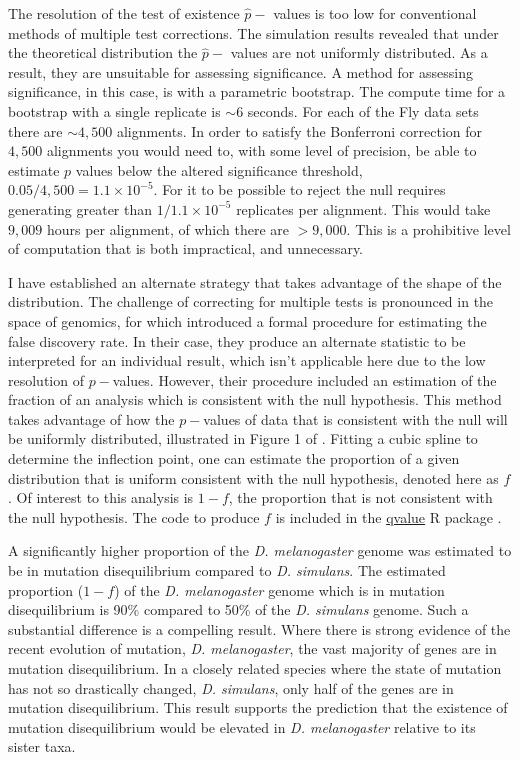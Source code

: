 The resolution of the test of existence $\hat p-$ values is too low for conventional methods of multiple test corrections. The simulation results revealed that under the theoretical distribution the $\hat p-$ values are not uniformly distributed. As a result, they are unsuitable for assessing significance. A method for assessing significance, in this case, is with a parametric bootstrap. The compute time for a bootstrap with a single replicate is ${\sim} 6$ seconds. For each of the Fly data sets there are ${\sim} 4,500$ alignments. In order to satisfy the Bonferroni correction for $4,500$ alignments you would need to, with some level of precision, be able to estimate $p$ values below the altered significance threshold, $0.05/4,500 = 1.1{\times}10^{-5}$. For it to be possible to reject the null requires generating greater than $1/1.1{\times}10^{-5}$ replicates per alignment. This would take $9,009$ hours per alignment, of which there are $>9,000$. This is a prohibitive level of computation that is both impractical, and unnecessary. 

I have established an alternate strategy that takes advantage of the shape of the distribution. The challenge of correcting for multiple tests is pronounced in the space of genomics, for which \cite{Storey2003StatisticalStudies} introduced a formal procedure for estimating the false discovery rate. In their case, they produce an alternate statistic to be interpreted for an individual result, which isn't applicable here due to the low resolution of $p-$values. However, their procedure included an estimation of the fraction of an analysis which is consistent with the null hypothesis. This method takes advantage of how the $p-$values of data that is consistent with the null will be uniformly distributed, illustrated in Figure 1 of \citep{Storey2003StatisticalStudies}. Fitting a cubic spline to determine the inflection point, one can estimate the proportion of a given distribution that is uniform consistent with the null hypothesis, denoted here as $f$. Of interest to this analysis is $1 - f$, the proportion that is not consistent with the null hypothesis. The code to produce $f$ is included in the \href{https://github.com/StoreyLab/qvalue}{qvalue} R package \citep{Storey2004StrongApproach}.  

A significantly higher proportion of the \textit{D. melanogaster} genome was estimated to be in mutation disequilibrium compared to \textit{D. simulans}. The estimated proportion ($1 - f$) of the \textit{D. melanogaster} genome which is in mutation disequilibrium is 90\% compared to 50\% of the \textit{D. simulans} genome. Such a substantial difference is a compelling result. Where there is strong evidence of the recent evolution of mutation, \textit{D. melanogaster}, the vast majority of genes are in mutation disequilibrium. In a closely related species where the state of mutation has not so drastically changed, \textit{D. simulans}, only half of the genes are in mutation disequilibrium. This result supports the prediction that the existence of mutation disequilibrium would be elevated in \textit{D. melanogaster} relative to its sister taxa.

